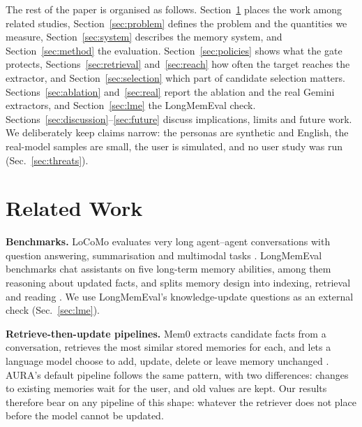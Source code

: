 \IfFileExists{IEEEtran.cls}{\documentclass[journal]{IEEEtran}\def\HAVEIEEE{1}}{\documentclass[10pt,twocolumn]{article}\usepackage[margin=0.7in,columnsep=0.25in]{geometry}}
\newcommand{\aura}{AURA}
\begin{document}
The rest of the paper is organised as follows. Section~\ref{sec:related} places the work among related studies, Section~\ref{sec:problem} defines the problem and the quantities we measure, Section~\ref{sec:system} describes the memory system, and Section~\ref{sec:method} the evaluation. Section~\ref{sec:policies} shows what the gate protects, Sections~\ref{sec:retrieval} and~\ref{sec:reach} how often the target reaches the extractor, and Section~\ref{sec:selection} which part of candidate selection matters. Sections~\ref{sec:ablation} and~\ref{sec:real} report the ablation and the real Gemini extractors, and Section~\ref{sec:lme} the LongMemEval check. Sections~\ref{sec:discussion}--\ref{sec:future} discuss implications, limits and future work. We deliberately keep claims narrow: the personas are synthetic and English, the real-model samples are small, the user is simulated, and no user study was run (Sec.~\ref{sec:threats}).

\section{Related Work}
\label{sec:related}
\textbf{Benchmarks.} LoCoMo evaluates very long agent--agent conversations with question answering, summarisation and multimodal tasks \cite{maharana2024locomo}. LongMemEval benchmarks chat assistants on five long-term memory abilities, among them reasoning about updated facts, and splits memory design into indexing, retrieval and reading \cite{wu2024longmemeval}. We use LongMemEval's knowledge-update questions as an external check (Sec.~\ref{sec:lme}).

\textbf{Retrieve-then-update pipelines.} Mem0 extracts candidate facts from a conversation, retrieves the most similar stored memories for each, and lets a language model choose to add, update, delete or leave memory unchanged \cite{chhikara2025mem0}. \aura's default pipeline follows the same pattern, with two differences: changes to existing memories wait for the user, and old values are kept. Our results therefore bear on any pipeline of this shape: whatever the retriever does not place before the model cannot be updated.
\end{document}
